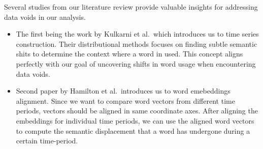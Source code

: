 Several studies from our literature review provide valuable insights for addressing data voids in our analysis.
\begin{itemize}
    \item The first being the work by Kulkarni et al.\ which introduces us to time series construction.
Their distributional methods focuses on finding subtle semantic shits to determine the context where a word in used.
This concept aligns perfectly with our goal of uncovering shifts in word usage when encountering data voids.
    \item Second paper by Hamilton et al.\ introduces us to word emebeddings alignment.
Since we want to compare word vectors from different time periods, vectors should be aligned in same coordinate axes.
After aligning the embeddings for individual time periods, we can use the aligned word vectors to compute the semantic displacement that a word has undergone during a certain time-period.
\end{itemize}